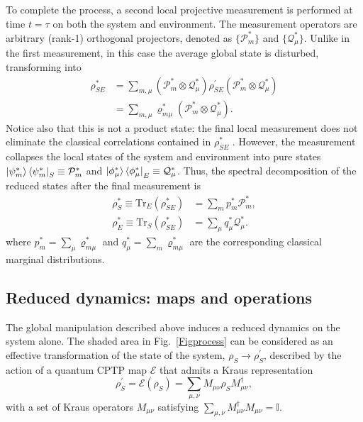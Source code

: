 \documentclass[aps,prx,twocolumn,showpacs,floatfix,superscriptaddress,graphics,longbibliography]{revtex4-1}
\newcommand{\tr}{\mathrm{Tr}}
\newcommand{\E}{{\mathcal E}}
\newcommand{\HAT}{}
\begin{document}
To complete the process, a second local projective measurement is performed at time $t=\tau$ on both the system and environment. 
The measurement operators are arbitrary (rank-1) orthogonal projectors, denoted as $\{\HAT{\mathcal{P}}_m^\ast\}$ and $\{\HAT{\mathcal{Q}}_\mu^\ast \}$. 
Unlike in the first measurement, in this case the average global state is disturbed, transforming into
\begin{align}\label{global_final}
\rho_{SE}^\ast & = \sum_{m, \mu} (\HAT{\mathcal{P}}_m^\ast \otimes \HAT{\mathcal{Q}}_\mu^\ast) \rho_{S E}^\prime 
(\HAT{\mathcal{P}}_m^\ast \otimes \HAT{\mathcal{Q}}_\mu^\ast) \nonumber \\ 
& = \sum_{m, \mu} \varrho_{m  \mu}^\ast (\HAT{\mathcal{P}}_m^\ast \otimes \HAT{\mathcal{Q}}_\mu^\ast).
\end{align}
Notice also that this  is not a product state: the final local measurement does not eliminate the classical correlations contained in $\rho_{SE}^\ast$ \cite{Groisman}.
However, the measurement collapses the local states of the system and environment into pure states $\ket{\psi_m^\ast}\bra{\psi_m^\ast}_S \equiv \HAT{\mathcal{P}}_m^\ast$ and $\ket{\phi_\mu^\ast}\bra{\phi_\mu^\ast}_E \equiv \HAT{\mathcal{Q}}_\mu^\ast$. 
Thus, the spectral decomposition of the reduced states after the final measurement is 
\begin{align}
\rho_S^\ast \equiv \tr_E(\rho^*_{SE}) & = \sum_m p_m^\ast \HAT{\mathcal{P}}_m^{\ast},  \\
\rho_E^\ast \equiv\tr_S(\rho^*_{SE}) & = \sum_\mu q_\mu^\ast \HAT{\mathcal{Q}}_\mu^\ast. 
\end{align}
where $p_m^\ast=\sum_\mu \varrho_{m  \mu}^\ast$ and  $q_\mu^\ast=\sum_m \varrho_{m  \mu}^\ast$ are the corresponding classical marginal distributions.

\subsection{Reduced dynamics: maps and operations}

The global manipulation described above induces a reduced dynamics on the system alone. The shaded area in Fig.~\ref{Figprocess} can be considered as an effective transformation of the state of the system, $\rho_S \rightarrow \rho_S^\prime$, described by the action of a 
quantum CPTP map $ \E$ that admits a Kraus representation \cite{Kraus}
\begin{equation}\label{f_map}
\rho_S^\prime = \E(\rho_S)=\sum_{\mu, \nu} \HAT{M}_{\mu \nu} \rho_S \HAT{M}_{\mu \nu}^\dagger,
\end{equation}
with a set of Kraus operators $\HAT{M}_{\mu \nu}$ satisfying $\sum_{\mu, \nu} \HAT{M}_{\mu \nu}^\dagger \HAT{M}_{\mu \nu} = \mathbb{I}$.
\end{document}
